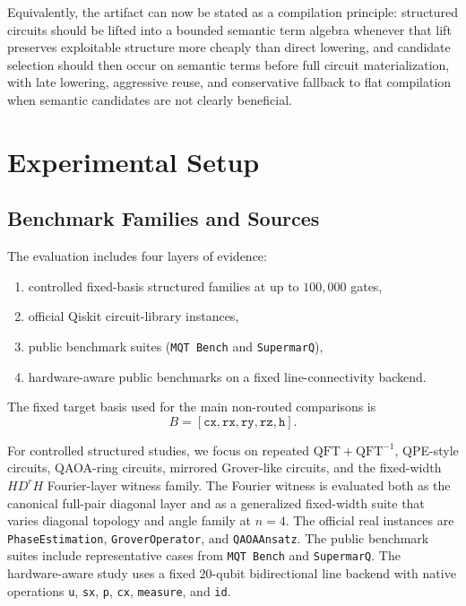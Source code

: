 \documentclass[11pt]{article}
\begin{document}
Equivalently, the artifact can now be stated as a compilation principle:
structured circuits should be lifted into a bounded semantic term algebra
whenever that lift preserves exploitable structure more cheaply than direct
lowering, and candidate selection should then occur on semantic terms before
full circuit materialization, with late lowering, aggressive reuse, and
conservative fallback to flat compilation when semantic candidates are not
clearly beneficial.

\section{Experimental Setup}
\label{sec:experimental-setup}

\subsection{Benchmark Families and Sources}

The evaluation includes four layers of evidence:
\begin{enumerate}[leftmargin=1.5em]
    \item controlled fixed-basis structured families at up to $100{,}000$ gates,
    \item official Qiskit circuit-library instances,
    \item public benchmark suites (\texttt{MQT Bench} and \texttt{SupermarQ}),
    \item hardware-aware public benchmarks on a fixed line-connectivity backend.
\end{enumerate}

The fixed target basis used for the main non-routed comparisons is
\[
B = [\texttt{cx},\texttt{rx},\texttt{ry},\texttt{rz},\texttt{h}].
\]

For controlled structured studies, we focus on repeated $\mathrm{QFT}+\mathrm{QFT}^{-1}$, QPE-style circuits, QAOA-ring circuits, mirrored Grover-like circuits, and the fixed-width $H D^r H$ Fourier-layer witness family. The Fourier witness is evaluated both as the canonical full-pair diagonal layer and as a generalized fixed-width suite that varies diagonal topology and angle family at $n=4$. The official real instances are \texttt{PhaseEstimation}, \texttt{GroverOperator}, and \texttt{QAOAAnsatz}. The public benchmark suites include representative cases from \texttt{MQT Bench} and \texttt{SupermarQ}. The hardware-aware study uses a fixed $20$-qubit bidirectional line backend with native operations \texttt{u}, \texttt{sx}, \texttt{p}, \texttt{cx}, \texttt{measure}, and \texttt{id}.
\end{document}
